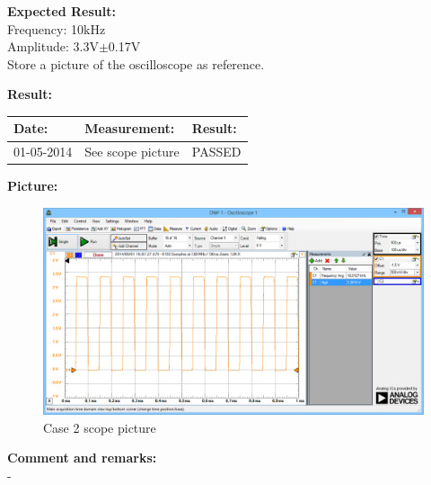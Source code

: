 \begin{figure}[H]
	\centering
\end{figure}

\textbf{Expected Result:}\\
Frequency: 10kHz\\
Amplitude: 3.3V$\pm$0.17V\\
Store a picture of the oscilloscope as reference.


\textbf{Result:}
\begin{table}[H]
	\centering
	\begin{tabular}{|p{2cm}|p{3cm}|p{2cm}|}\hline
		\textbf{Date:} & \textbf{Measurement:} & \textbf{Result:} \\ \hline
		01-05-2014 & See scope picture & PASSED \\ \hline
	\end{tabular}
\end{table}
\textbf{Picture:}
\begin{figure}[H]
	\centering
	\includegraphics[width=.8\textwidth]{billeder/SN_Case2_osc_picture}
	\caption{Case 2 scope picture}
\end{figure}
\textbf{Comment and remarks:}\\
-\\

